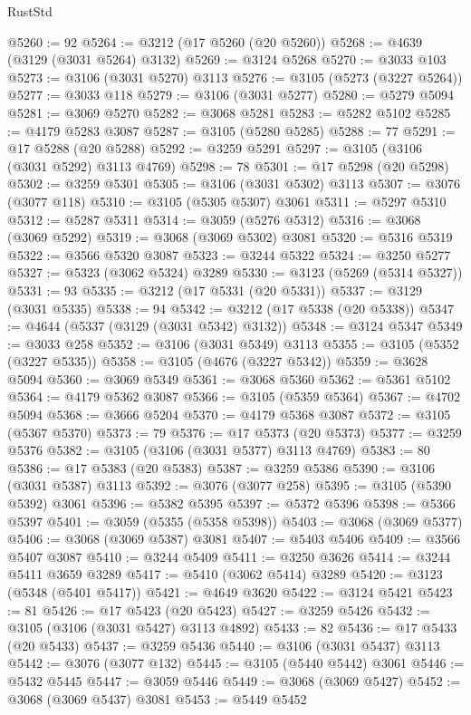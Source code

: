 \begin{lexlean}{RustStd}
\begin{coremodule}
@5260 := 92
@5264 := @3212 (@17 @5260 (@20 @5260))
@5268 := @4639 (@3129 (@3031 @5264) @3132)
@5269 := @3124 @5268
@5270 := @3033 @103
@5273 := @3106 (@3031 @5270) @3113
@5276 := @3105 (@5273 (@3227 @5264))
@5277 := @3033 @118
@5279 := @3106 (@3031 @5277)
@5280 := @5279 @5094
@5281 := @3069 @5270
@5282 := @3068 @5281
@5283 := @5282 @5102
@5285 := @4179 @5283 @3087
@5287 := @3105 (@5280 @5285)
@5288 := 77
@5291 := @17 @5288 (@20 @5288)
@5292 := @3259 @5291
@5297 := @3105 (@3106 (@3031 @5292) @3113 @4769)
@5298 := 78
@5301 := @17 @5298 (@20 @5298)
@5302 := @3259 @5301
@5305 := @3106 (@3031 @5302) @3113
@5307 := @3076 (@3077 @118)
@5310 := @3105 (@5305 @5307) @3061
@5311 := @5297 @5310
@5312 := @5287 @5311
@5314 := @3059 (@5276 @5312)
@5316 := @3068 (@3069 @5292)
@5319 := @3068 (@3069 @5302) @3081
@5320 := @5316 @5319
@5322 := @3566 @5320 @3087
@5323 := @3244 @5322
@5324 := @3250 @5277
@5327 := @5323 (@3062 @5324) @3289
@5330 := @3123 (@5269 (@5314 @5327))
@5331 := 93
@5335 := @3212 (@17 @5331 (@20 @5331))
@5337 := @3129 (@3031 @5335)
@5338 := 94
@5342 := @3212 (@17 @5338 (@20 @5338))
@5347 := @4644 (@5337 (@3129 (@3031 @5342) @3132))
@5348 := @3124 @5347
@5349 := @3033 @258
@5352 := @3106 (@3031 @5349) @3113
@5355 := @3105 (@5352 (@3227 @5335))
@5358 := @3105 (@4676 (@3227 @5342))
@5359 := @3628 @5094
@5360 := @3069 @5349
@5361 := @3068 @5360
@5362 := @5361 @5102
@5364 := @4179 @5362 @3087
@5366 := @3105 (@5359 @5364)
@5367 := @4702 @5094
@5368 := @3666 @5204
@5370 := @4179 @5368 @3087
@5372 := @3105 (@5367 @5370)
@5373 := 79
@5376 := @17 @5373 (@20 @5373)
@5377 := @3259 @5376
@5382 := @3105 (@3106 (@3031 @5377) @3113 @4769)
@5383 := 80
@5386 := @17 @5383 (@20 @5383)
@5387 := @3259 @5386
@5390 := @3106 (@3031 @5387) @3113
@5392 := @3076 (@3077 @258)
@5395 := @3105 (@5390 @5392) @3061
@5396 := @5382 @5395
@5397 := @5372 @5396
@5398 := @5366 @5397
@5401 := @3059 (@5355 (@5358 @5398))
@5403 := @3068 (@3069 @5377)
@5406 := @3068 (@3069 @5387) @3081
@5407 := @5403 @5406
@5409 := @3566 @5407 @3087
@5410 := @3244 @5409
@5411 := @3250 @3626
@5414 := @3244 @5411 @3659 @3289
@5417 := @5410 (@3062 @5414) @3289
@5420 := @3123 (@5348 (@5401 @5417))
@5421 := @4649 @3620
@5422 := @3124 @5421
@5423 := 81
@5426 := @17 @5423 (@20 @5423)
@5427 := @3259 @5426
@5432 := @3105 (@3106 (@3031 @5427) @3113 @4892)
@5433 := 82
@5436 := @17 @5433 (@20 @5433)
@5437 := @3259 @5436
@5440 := @3106 (@3031 @5437) @3113
@5442 := @3076 (@3077 @132)
@5445 := @3105 (@5440 @5442) @3061
@5446 := @5432 @5445
@5447 := @3059 @5446
@5449 := @3068 (@3069 @5427)
@5452 := @3068 (@3069 @5437) @3081
@5453 := @5449 @5452

\end{coremodule}
\end{lexlean}
